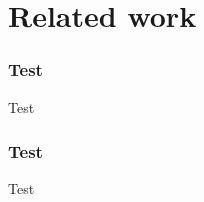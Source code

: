 \chapter{Related work}

\pagestyle{fancy}

\label{relatedWork}

\subsection{Test}

Test

\subsection{Test}

Test